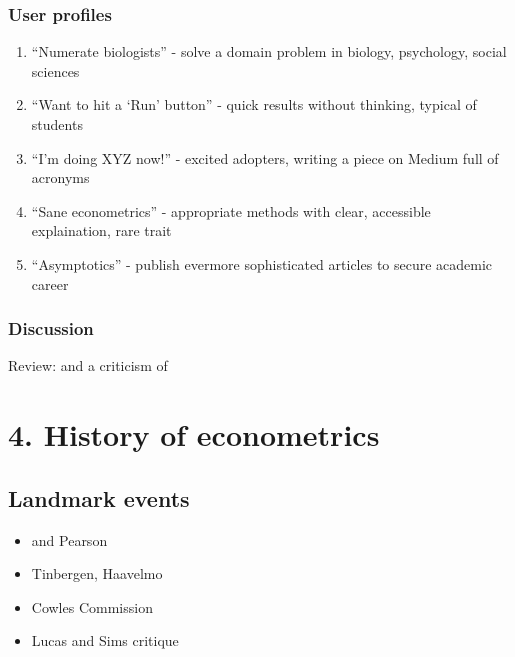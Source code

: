 \documentclass[letterpaper,10pt,english]{sphinxmanual}
\begin{document}
\subsection{User profiles}
\label{\detokenize{how-to-teach/mindmap:user-profiles}}\begin{enumerate}
%
\item {} 
“Numerate biologists” - solve a domain problem in biology, psychology, social sciences

\item {} 
“Want to hit a ‘Run’ button” - quick results without thinking, typical of students

\item {} 
“I’m doing XYZ now!” - excited adopters, writing a piece on Medium full of acronyms

\item {} 
“Sane econometrics” - appropriate methods with clear, accessible explaination, rare trait

\item {} 
“Asymptotics” - publish evermore sophisticated articles to secure academic career

\end{enumerate}


\subsection{Discussion}
\label{\detokenize{how-to-teach/mindmap:discussion}}
Review:  and a criticism of 


\chapter{4. History of econometrics}
\label{\detokenize{references/history:history-of-econometrics}}\label{\detokenize{references/history::doc}}

\section{Landmark events}
\label{\detokenize{references/history:landmark-events}}\begin{itemize}
\item {} 
 and Pearson

\item {} 
Tinbergen, Haavelmo

\item {} 
Cowles Commission

\item {} 
Lucas and Sims critique

\end{itemize}
\end{document}
